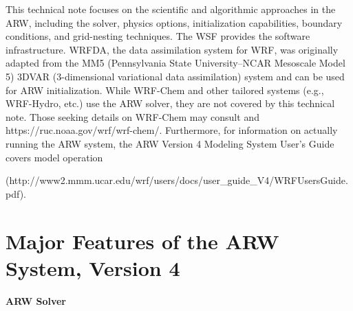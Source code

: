 This technical note focuses on the scientific and algorithmic 
approaches in the ARW, including the solver, physics options,
initialization capabilities, boundary conditions, and grid-nesting techniques.  
The WSF provides the software infrastructure.  
WRFDA, the data assimilation system for WRF, was  
originally adapted from the MM5 
(Pennsylvania State University--NCAR Mesoscale Model 5) 
3DVAR (3-dimensional variational data assimilation) system 
\citep{barker04} and can be used for ARW initialization.
While WRF-Chem and other tailored systems 
(e.g., WRF-Hydro, etc.) use the ARW solver, they are 
not covered by this technical note.  Those seeking details on 
WRF-Chem may consult \citet{Grelletal05} and 
https://ruc.noaa.gov/wrf/wrf-chem/.  Furthermore, for information on 
actually running the ARW system, the ARW Version 4 Modeling System User's Guide
covers model operation
 
{\noindent(http://www2.mmm.ucar.edu/wrf/users/docs/user\_guide\_V4/WRFUsersGuide.pdf).  }

\section {Major Features of the ARW System, Version 4}

\vskip 12pt
{\noindent\bf ARW Solver}
\vskip 12pt

